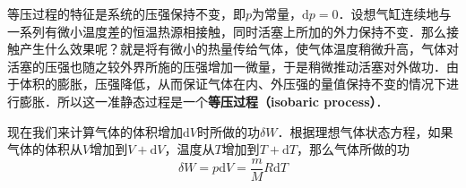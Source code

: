 

等压过程的特征是系统的压强保持不变，即$p $为常量，$\mathrm dp =0$．设想气缸连续地与一系列有微小温度差的恒温热源相接触，同时活塞上所加的外力保持不变．那么接触产生什么效果呢？就是将有微小的热量传给气体，使气体温度稍微升高，气体对活塞的压强也随之较外界所施的压强增加一微量，于是稍微推动活塞对外做功．由于体积的膨胀，压强降低，从而保证气体在内、外压强的量值保持不变的情况下进行膨胀．所以这一准静态过程是一个\textbf{等压过程（isobaric process）}．

现在我们来计算气体的体积增加$\mathrm d V $时所做的功$\delta W$．根据理想气体状态方程，如果气体的体积从$V $增加到$V+\mathrm dV$，温度从$T $增加到$T+\mathrm dT$，那么气体所做的功
\begin{equation}
\delta W=p \mathrm{d} V=\frac{m}{M} R \mathrm{d} T
\end{equation}